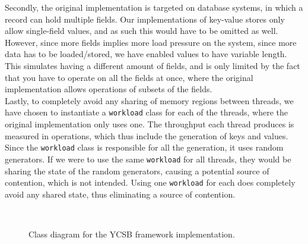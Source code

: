 \documentclass[11pt]{article} %
\begin{document}
Secondly, the original implementation is targeted on database systems, in which a record can hold multiple fields. Our implementations of key-value stores only allow single-field values, and as such this would have to be omitted as well. However, since more fields implies more load pressure on the system, since more data has to be loaded/stored, we have enabled values to have variable length. This simulates having a different amount of fields, and is only limited by the fact that you have to operate on all the fields at once, where the original implementation allows operations of subsets of the fields.\\

Lastly, to completely avoid any sharing of memory regions between threads, we have chosen to instantiate a \verb|workload| class for each of the threads, where the original implementation only uses one. The throughput each thread produces is measured in operations, which thus include the generation of keys and values. Since the \verb|workload| class is responsible for all the generation, it uses random generators. If we were to use the same \verb|workload| for all threads, they would be sharing the state of the random generators, causing a potential source of contention, which is not intended. Using one \verb|workload| for each does completely avoid any shared state, thus eliminating a source of contention.\\

\begin{figure}[H]
  \\
  \caption{Class diagram for the YCSB framework implementation.}\label{fig:UML_YCSB}
\end{figure}
\end{document}
